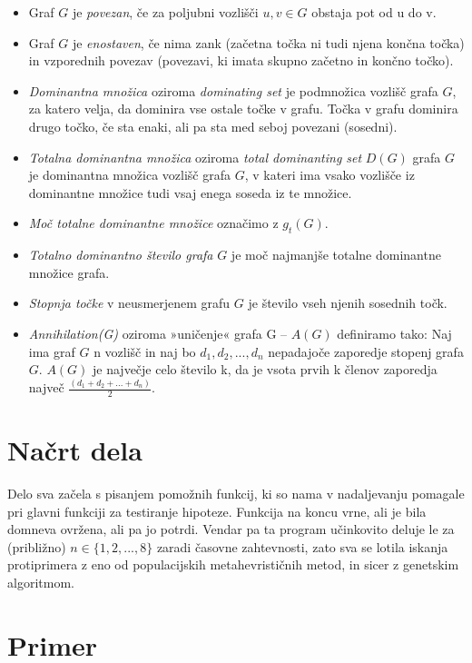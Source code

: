 \documentclass[11pt, a4paper]{article}
\begin{document}
\begin{itemize}
 	\item Graf $G$ je \textit{povezan}, če za poljubni vozlišči $u,v \in G$ obstaja pot od u do v.
	\item Graf $G$ je \textit{enostaven}, če nima zank (začetna točka ni tudi njena končna točka) in vzporednih povezav (povezavi, ki imata skupno začetno in končno točko). 
	\item \textit{Dominantna množica} oziroma \textit{dominating set} je podmnožica vozlišč grafa $G$, za katero velja, da dominira vse ostale točke v grafu.  Točka v grafu dominira drugo točko, če sta enaki, ali pa sta med seboj povezani (sosedni). 
           \item \textit{Totalna dominantna množica} oziroma \textit{total dominanting set} $D(G)$ grafa $G$ je dominantna množica vozlišč grafa $G$, v kateri ima vsako vozlišče iz dominantne množice tudi vsaj enega soseda iz te množice.
           \item \textit{Moč totalne dominantne množice} označimo z  $g_t (G)$.
           \item \textit{Totalno dominantno število grafa} $G$ je moč najmanjše totalne dominantne množice grafa. 
           \item \textit{Stopnja točke} v neusmerjenem grafu $G$ je število vseh njenih sosednih točk.
           \item \textit{Annihilation(G)} oziroma »uničenje« grafa G – $A(G)$ definiramo tako: Naj ima graf $G$ n vozlišč in naj bo $d_1,d_2, ...,d_n$ nepadajoče zaporedje stopenj grafa $G$. $A(G)$ je največje celo število k, da je vsota prvih k členov zaporedja največ  $\frac{(d_1 + d_2+ ... + d_n)}{2}$.

\end{itemize}

\section{\textbf{Načrt dela}}

Delo sva začela s pisanjem pomožnih funkcij, ki so nama v nadaljevanju pomagale pri glavni funkciji za testiranje hipoteze. Funkcija na koncu vrne, ali je bila domneva ovržena, ali pa jo potrdi. Vendar pa ta program učinkovito deluje le za (približno) $n \in \{1, 2, ..., 8\}$ zaradi časovne zahtevnosti, zato sva se lotila iskanja protiprimera z eno od populacijskih metahevrističnih metod, in sicer z genetskim algoritmom. 

\section{\textbf{Primer}}
\end{document}
